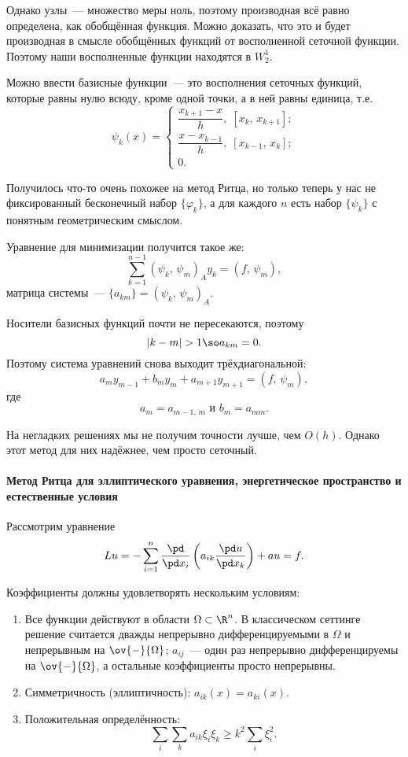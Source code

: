 \documentclass{trlnotes}
\begin{document}
    Однако узлы~--- множество меры ноль, поэтому производная всё равно определена, как обобщённая функция. Можно доказать, что это и будет производная в смысле обобщённых функций от восполненной сеточной функции. Поэтому наши восполненные функции находятся в $W_2^1$.

    Можно ввести базисные функции~--- это восполнения сеточных функций, которые равны нулю всюду, кроме одной точки, а в ней равны единица, т.е.
    \[
        \psi_k(x) = \begin{cases}
            \dfrac{x_{k + 1} - x}{h}, \; [x_k, \, x_{k + 1}]; \\ 
            \dfrac{x - x_{k - 1}}{h}, \; [x_{k - 1}, \, x_k]; \\
            0.
        \end{cases}
    \]

    Получилось что-то очень похожее на метод Ритца, но только теперь у нас не фиксированный бесконечный набор $\{\varphi_k\}$, а для каждого $n$ есть набор $\{\psi_k\}$ с понятным геометрическим смыслом.

    Уравнение для минимизации получится такое же:
    \[
        \sum\limits_{k = 1}^{n - 1}(\psi_k, \, \psi_m)_A y_k = (f, \, \psi_m),
    \]
    матрица системы~--- $\{a_{km}\} = (\psi_k, \, \psi_m)_A$.

    Носители базисных функций почти не пересекаются, поэтому
    \[
        |k - m| > 1 \so a_{km} = 0.
    \]
    Поэтому система уравнений снова выходит трёхдиагональной:
    \[
        a_m y_{m - 1} + b_m y_m + a_{m + 1} y_{m + 1} = (f, \, \psi_m),
    \]
    где
    \[
        a_m = a_{m-1, \, m} \text{ и } b_m = a_{mm}.
    \]

    На негладких решениях мы не получим точности лучше, чем $O(h)$. Однако этот метод для них надёжнее, чем просто сеточный.

    \paragraph{Метод Ритца для эллиптического уравнения, энергетическое пространство и естественные условия}

    Рассмотрим уравнение
    \[
        Lu = - \sum\limits_{i = 1}^n \dfrac{\pd}{\pd x_i}\left(a_{ik} \dfrac{\pd u}{\pd x_k}\right) + au = f.
    \]

    Коэффициенты должны удовлетворять нескольким условиям:

    \begin{enumerate}
        \item Все функции действуют в области $\Omega \subset \R^n$. В классическом сеттинге решение считается дважды непрерывно дифференцируемыми в $\Omega$ и непрерывным на $\ov{-}{\Omega}$; $a_{ij}$~--- один раз непрерывно дифференцируемы на $\ov{-}{\Omega}$, а остальные коэффициенты просто непрерывны.
        \item Симметричность (эллиптичность): $a_{ik}(x) = a_{ki}(x)$.
        \item Положительная определённость:
        \[
            \sum\limits_i \sum\limits_k a_{ik} \xi_i \xi_k \geqslant k^2 \sum\limits_i \xi_i^2.
        \]
    \end{enumerate}
\end{document}
